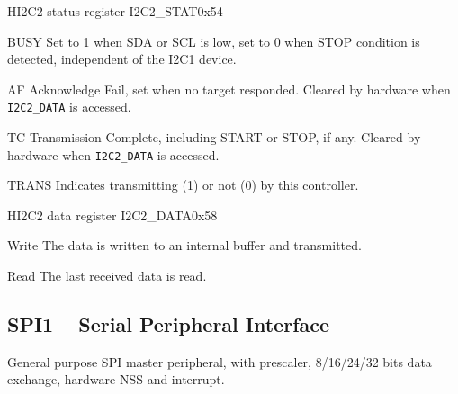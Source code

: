 \documentclass[12pt]{article}
\begin{document}
\begin{register}{H}{I2C2 status register I2C2\_STAT}{0x54}
\label{i2c2stat}
%
%
%
%
%
%
\regnewline%
\end{register}
\begin{regdesc}[0.8\textwidth]\begin{reglist}[0000000]
\item [BUSY] Set to 1 when SDA or SCL is low, set to 0 when STOP condition is detected, independent of the I2C1 device.
\item [AF] Acknowledge Fail, set when no target responded. Cleared by hardware when \lstinline|I2C2_DATA| is accessed.
\item [TC] Transmission Complete, including START or STOP, if any. Cleared by hardware when \lstinline|I2C2_DATA| is accessed.
\item [TRANS] Indicates transmitting (1) or not (0) by this controller.
\end{reglist}\end{regdesc}

\begin{register}{H}{I2C2 data register I2C2\_DATA}{0x58}
\label{i2c21data}
%
\regnewline%
\end{register}
\begin{regdesc}[0.8\textwidth]\begin{reglist}[000000000]
\item[Write] The data is written to an internal buffer and transmitted.
\item[Read] The last received data is read.
\end{reglist}\end{regdesc}


\subsection{SPI1 -- Serial Peripheral Interface}
General purpose SPI master peripheral, with prescaler, 8/16/24/32 bits data exchange, hardware NSS and interrupt.
\end{document}
